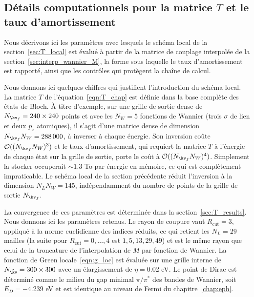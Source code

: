 \subsection{Détails computationnels pour la matrice $T$ et le taux d'amortissement}\label{sec:T_détails}

Nous décrivons ici les paramètres avec lesquels le schéma local de la section~\ref{sec:T_local} est évalué à partir de la matrice de couplage interpolée de la section~\ref{sec:interp_wannier_M}, la forme sous laquelle le taux d'amortissement est rapporté, ainsi que les contrôles qui protègent la chaîne de calcul.


Nous donnons ici quelques chiffres qui justifient l'introduction du schéma local. La matrice $T$ de l'équation~\eqref{eqn:T_chap} est définie dans la base complète des états de Bloch. À titre d'exemple, sur une grille de sortie dense de $N_{\kv_f} = 240\times 240$ points et avec les $N_W=5$ fonctions de Wannier (trois $\sigma$ de lien et deux $p_z$ atomiques), il s'agit d'une matrice dense de dimension $N_{\kv_f}N_W=288\,000$, à inverser à chaque énergie. Son inversion coûte $\mathcal{O}((N_{\kv_f}N_W)^3)$ et le taux d'amortissement, qui requiert la matrice $T$ à l'énergie de chaque état sur la grille de sortie, porte le coût à $\mathcal{O}((N_{\kv_f}N_W)^4)$. Simplement la stocker occuperait $\sim 1.3$ To par énergie en mémoire, ce qui est complètement impraticable. Le schéma local de la section précédente réduit l'inversion à la dimension $N_LN_W=145$, indépendamment du nombre de points de la grille de sortie $N_{\kv_f}$.


La convergence de ces paramètres est déterminée dans la section~\ref{sec:T_results}. Nous donnons ici les paramètres retenus. Le rayon de coupure vaut $R_\text{cut}=3$, appliqué à la norme euclidienne des indices réduits, ce qui retient les $N_L=29$ mailles (la suite pour $R_\text{cut}=0,\dots,4$ est $1, 5, 13, 29, 49$) et est le même rayon que celui de la troncature de l'interpolation de $M$ par fonction de Wannier. La fonction de Green locale~\eqref{eqn:g_loc} est évaluée sur une grille interne de $N_{\tilde\kv}=300\times 300$ avec un élargissement de $\eta=0.02$ eV. Le point de Dirac est déterminé comme le milieu du gap minimal $\pi/\pi^*$ des bandes de Wannier, soit $E_D=-4.239$ eV et est identique au niveau de Fermi du chapitre~\ref{chap:eph}.


